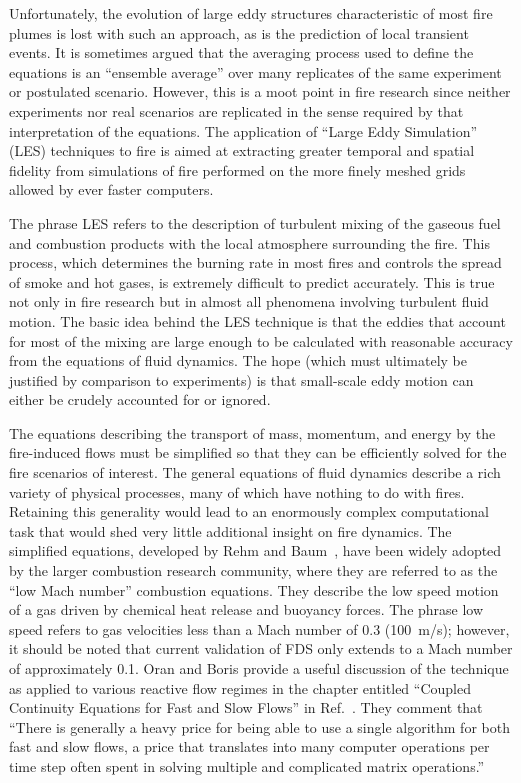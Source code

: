 Unfortunately, the evolution of large eddy structures characteristic of most fire plumes is lost
with such an approach, as is the prediction of local transient events. It is sometimes
argued that the averaging process used to define the equations is an ``ensemble average'' over many
replicates of the same experiment or postulated scenario. However, this is a moot point in
fire research since neither experiments nor real scenarios are replicated in the sense required
by that interpretation of the equations. The application of ``Large Eddy Simulation'' (LES)
techniques to fire is aimed at extracting greater temporal and spatial fidelity from simulations
of fire performed on the more finely meshed grids allowed by ever faster computers.

The phrase LES refers to the description of turbulent mixing of the gaseous fuel and combustion
products with the local atmosphere surrounding the fire. This process, which determines the burning
rate in most fires and controls the spread of smoke and hot gases, is extremely difficult
to predict accurately. This is true not only in fire research but in almost all phenomena
involving turbulent fluid motion. The basic idea behind the LES technique is that the eddies
that account for most of the mixing are large enough to be calculated with reasonable
accuracy from the equations of fluid dynamics. The hope (which must ultimately be justified
by comparison to experiments) is that small-scale eddy motion can either be crudely accounted for or ignored.

The equations describing the transport of mass, momentum, and energy by the fire-induced flows must
be simplified so that they can be efficiently solved for the fire scenarios of interest.
The general equations of fluid dynamics describe a rich variety of physical processes,
many of which have nothing to do with fires. Retaining this generality would lead to an
enormously complex computational task that would shed very little additional insight on fire dynamics.
The simplified equations, developed by Rehm and Baum~\cite{Rehm:1}, have been widely adopted
by the larger combustion research community, where they are referred to as the ``low Mach number''
combustion equations. They describe the low speed motion of a gas driven by chemical heat release and buoyancy forces.
The phrase low speed refers to gas velocities less than a Mach number of 0.3 (100~m/s); however, it should be noted that
current validation of FDS only extends to a Mach number of approximately 0.1.
Oran and Boris provide a useful discussion of the technique as applied to various reactive flow regimes in the chapter
entitled ``Coupled Continuity Equations for Fast and Slow Flows'' in Ref.~\cite{Oran:1}.
They comment that ``There is generally a heavy price for being able to use a single algorithm for both
fast and slow flows, a price that translates into many computer operations per time step often spent in
solving multiple and complicated matrix operations.''

